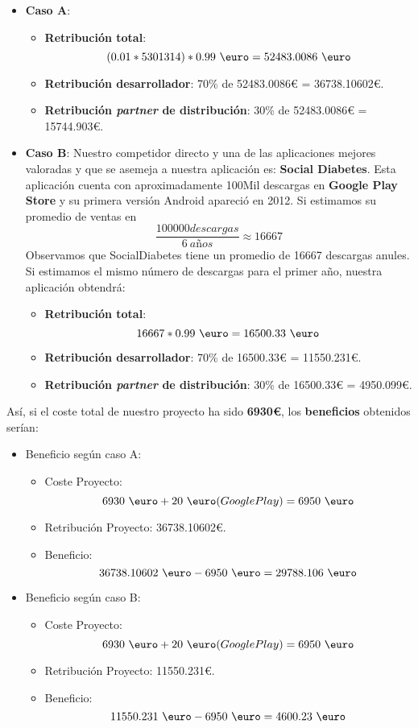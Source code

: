 \begin{itemize}
	\item \textbf{Caso A}:
		\begin{itemize}
			\item \textbf{Retribución total}: \[(0.01 * 5301314) * 0.99~{\mbox{\euro}} = 52483.0086~{\mbox{\euro}} \]
			\item \textbf{Retribución desarrollador}: 70\% de 52483.0086\euro{} = 36738.10602\euro{}.
			\item \textbf{Retribución \textit{partner} de distribución}: 30\% de 52483.0086\euro{} = 15744.903\euro{}.
		\end{itemize}
	\item \textbf{Caso B}:
	Nuestro competidor directo y una de las aplicaciones mejores valoradas y que se asemeja a nuestra aplicación es: \textbf{Social Diabetes}. Esta aplicación cuenta con aproximadamente 100Mil descargas en \textbf{Google Play Store} y su primera versión Android apareció en 2012. Si estimamos su promedio de ventas en~\cite{socialdiabetes}
	\[ \frac{100000\textit{descargas}}{6 \ a\textit{ñ}os} \approx 16667 \]
	Observamos que SocialDiabetes tiene un promedio de 16667 descargas anules. Si estimamos el  mismo número de descargas para el primer año, nuestra aplicación obtendrá:
	\begin{itemize}
			\item \textbf{Retribución total}: \[16667 * 0.99~{\mbox{\euro}} = 16500.33~{\mbox{\euro}} \]
			\item \textbf{Retribución desarrollador}: 70\% de 16500.33\euro{} = 11550.231\euro{}.
			\item \textbf{Retribución \textit{partner} de distribución}: 30\% de 16500.33\euro{} = 4950.099\euro{}.
	\end{itemize}
\end{itemize}
Así, si el coste total de nuestro proyecto ha sido \textbf{6930\euro{}}, los \textbf{beneficios} obtenidos serían:
\begin{itemize}
	\item Beneficio según caso A:
	\begin{itemize}
		\item Coste Proyecto: \[6930~{\mbox{\euro}} + 20~{\mbox{\euro}}(GooglePlay) = 6950~{\mbox{\euro}} \]
		\item Retribución Proyecto: 36738.10602\euro{}.
		\item Beneficio: \[36738.10602~{\mbox{\euro}} - 6950~{\mbox{\euro}} = 29788.106~{\mbox{\euro}} \]
	\end{itemize}
	\item Beneficio según caso B:
	\begin{itemize}
		\item Coste Proyecto: \[6930~{\mbox{\euro}} + 20~{\mbox{\euro}}(GooglePlay) = 6950~{\mbox{\euro}} \]
		\item Retribución Proyecto: 11550.231\euro{}.
		\item Beneficio: \[11550.231~{\mbox{\euro}} - 6950~{\mbox{\euro}} = 4600.23~{\mbox{\euro}} \]
	\end{itemize}
\end{itemize}
